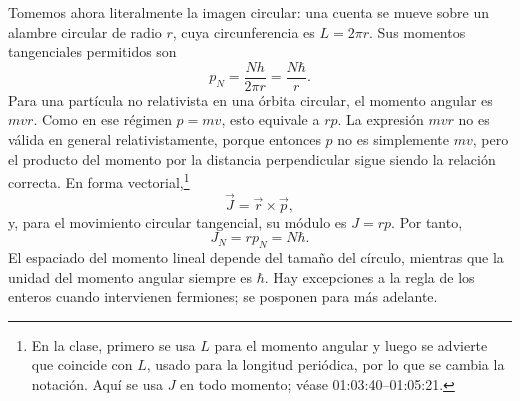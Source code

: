 \begin{classroomqa}
\end{classroomqa}

\begin{classroomqa}
\end{classroomqa}

Tomemos ahora literalmente la imagen circular: una cuenta se mueve sobre un alambre circular de radio \(r\), cuya circunferencia es \(L=2\pi r\). Sus momentos tangenciales permitidos son
\begin{equation}
p_N=\frac{Nh}{2\pi r}=\frac{N\hbar}{r}.
\end{equation}
Para una partícula no relativista en una órbita circular, el momento angular es \(mvr\). Como en ese régimen \(p=mv\), esto equivale a \(rp\). La expresión \(mvr\) no es válida en general relativistamente, porque entonces \(p\) no es simplemente \(mv\), pero el producto del momento por la distancia perpendicular sigue siendo la relación correcta. En forma vectorial,\footnote{En la clase, primero se usa \(L\) para el momento angular y luego se advierte que coincide con \(L\), usado para la longitud periódica, por lo que se cambia la notación. Aquí se usa \(J\) en todo momento; véase 01:03:40--01:05:21.}
\begin{equation}
\vec J=\vec r\times\vec p,
\end{equation}
y, para el movimiento circular tangencial, su módulo es \(J=rp\). Por tanto,
\begin{equation}
J_N=rp_N=N\hbar.
\end{equation}
El espaciado del momento lineal depende del tamaño del círculo, mientras que la unidad del momento angular siempre es \(\hbar\). Hay excepciones a la regla de los enteros cuando intervienen fermiones; se posponen para más adelante.

